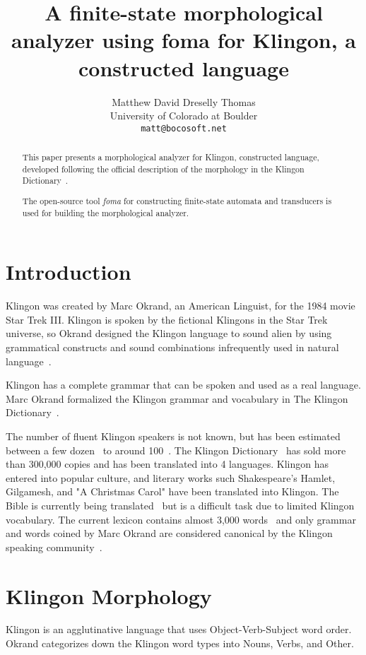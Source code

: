 \documentclass[11pt]{article}
\title{A finite-state morphological analyzer using foma for Klingon, a constructed language}
\author{Matthew David Dreselly Thomas \\
  University of Colorado at Boulder \\
  {\tt matt@bocosoft.net} \\}
\date{}
\begin{document}
\maketitle
\begin{abstract}
This paper presents a morphological analyzer for Klingon, constructed language, developed following the official description of the morphology in the Klingon Dictionary~\cite{Okrand:92}.

The open-source tool \textit{foma} for constructing finite-state automata and transducers is used for building the morphological analyzer.

\end{abstract}

\section{Introduction}

Klingon was created by Marc Okrand, an American Linguist, for the 1984 movie Star Trek III. Klingon is spoken by the fictional Klingons in the Star Trek universe, so Okrand designed the Klingon language to sound alien by using grammatical constructs and sound combinations infrequently used in natural language~\cite{KLI:Development,KLI:Sounds}.

Klingon has a complete grammar that can be spoken and used as a real language. Marc Okrand formalized the Klingon grammar and vocabulary in The Klingon Dictionary~\cite{Okrand:92}.

The number of fluent Klingon speakers is not known, but has been estimated between a few dozen~\cite{Okrent:09} to around 100~\cite{Kelly:13}. The Klingon Dictionary~\cite{Okrand:92} has sold more than 300,000 copies and has been translated into 4 languages. Klingon has entered into popular culture, and literary works such Shakespeare's Hamlet, Gilgamesh, and "A Christmas Carol" have been translated into Klingon. The Bible is currently being translated~\cite{KLI:Bible} but is a difficult task due to limited Klingon vocabulary. The current lexicon contains almost 3,000 words~\cite{Zrajm:12} and only grammar and words coined by Marc Okrand are considered canonical by the Klingon speaking community~\cite{KLI:Canonical}.

\section{Klingon Morphology}

Klingon is an agglutinative language that uses Object-Verb-Subject word order. Okrand categorizes down the Klingon word types into Nouns, Verbs, and Other.
\end{document}
